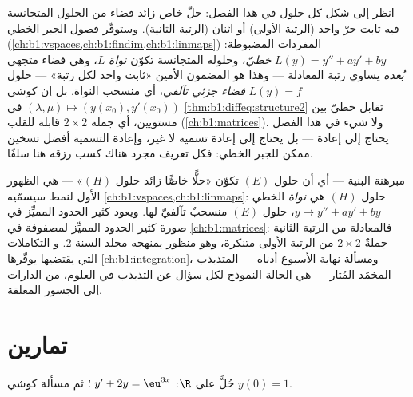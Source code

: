 \begin{remark}\label{rem:b1:diffeq:interlude}
انظر إلى شكل كل  حلول في هذا الفصل: حلّ
خاص زائد فضاء من الحلول المتجانسة فيه ثابت
حرّ واحد (الرتبة الأولى) أو اثنان (الرتبة الثانية). وستوفّر فصول
الجبر الخطي (\cref{ch:b1:vspaces,ch:b1:findim,ch:b1:linmaps})
المفردات المضبوطة:  $L(y) = y'' + ay' + by$ \emph{خطيّ}،
وحلوله المتجانسة تكوّن \emph{نواة} $L$، وهي فضاء
متجهي \emph{بُعده} يساوي رتبة المعادلة ---
وهذا هو المضمون الأمين  «ثابت واحد لكل رتبة» ---
 حلول $L(y) = f$ \emph{فضاء جزئي تآلفي}، أي
منسحب النواة. بل إن  كوشي $(\lambda, \mu)
\mapsto (y(x_0), y'(x_0))$ في \cref{thm:b1:diffeq:structure2}
تقابل خطيّ بين مستويين، أي جملة $2
\times 2$ قابلة للقلب (\cref{ch:b1:matrices}). ولا شيء في هذا الفصل
يحتاج إلى إعادة --- بل يحتاج إلى إعادة تسمية لا غير،
وإعادة التسمية أفضل تسخين ممكن للجبر الخطي:
فكل تعريف مجرد هناك كسب رزقه هنا سلفًا.
\end{remark}

\begin{remark}\label{rem:b1:diffeq:whereused}
مبرهنة البنية --- أي أن حلول $(E)$ تكوّن «حلًّا
خاصًّا زائد حلول $(H)$» --- هي الظهور الأول
لنمط سيسمّيه \cref{ch:b1:vspaces,ch:b1:linmaps}:  حلول
$(H)$ هي \emph{نواة}  الخطي $y
\mapsto y'' + ay' + by$،  حلول $(E)$ منسحبٌ
تآلفيّ لها. ويعود كثير الحدود المميِّز في صورة
كثير الحدود المميِّز لمصفوفة في \cref{ch:b1:matrices}:
فالمعادلة من الرتبة الثانية جملةٌ $2 \times 2$ من الرتبة الأولى
متنكرة، وهو منظور يمنهجه مجلد السنة 2. و
التكاملات التي يقتضيها  يوفّرها
\cref{ch:b1:integration}، ومسألة نهاية الأسبوع أدناه --- المتذبذب
المخمَد المُثار --- هي الحالة النموذج لكل سؤال عن
التذبذب في العلوم، من الدارات إلى الجسور المعلقة.
\end{remark}

\section{تمارين}

\begin{exercise}[$\star$]\label{exo:b1:diffeq:1}
حُلَّ على $\R$: $\;y' + 2y = \eu^{3x}$؛ ثم مسألة كوشي $y(0) =
1$.
\end{exercise}

